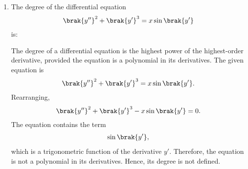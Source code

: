 \begin{enumerate}[label=\thesubsection.\arabic*, ref=\thesubsection.\theenumi]
\solution
Given,
\begin{align}
y = \tan^{-1}\brak{x^2}\label{eq:EE26BTECH11211_Prob_13.1}
\end{align}
from \eqref{eq:EE26BTECH11211_Prob_9.1} the derivative of $tan^{-1}u$ is
\begin{align}
\frac{d}{dx}\left(\tan^{-1}u\right)
= \frac{1}{1+u^2}\frac{du}{dx}\label{eq:EE26BTECH11211_Prob_13.2}.
\end{align}
Here, $u=x^2$, so
\begin{align}
\frac{du}{dx}=2x.
\end{align}
Applying the formula\eqref{eq:EE26BTECH11211_Prob_13.2} on \eqref{eq:EE26BTECH11211_Prob_13.1},
\begin{align}
\frac{dy}{dx}
= \frac{1}{1+\brak{x^2}^2}\cdot 2x.
\end{align}
Simplifying,
\begin{align}
\frac{dy}{dx}
= \frac{2x}{1+x^4}.
\end{align}


\item
The degree of the differential equation
\begin{align}
\brak{y''}^2 + \brak{y'}^3 = x\sin\brak{y'}
\end{align}
is:

\begin{enumerate}
\end{enumerate}
\solution
The degree of a differential equation is the highest power
of the highest-order derivative, provided the equation is
a polynomial in its derivatives.
The given equation is
\begin{align}
\brak{y''}^2 + \brak{y'}^3 = x\sin\brak{y'}.
\end{align}
Rearranging,
\begin{align}
\brak{y''}^2 + \brak{y'}^3 - x\sin\brak{y'} = 0.
\end{align}
The equation contains the term
\begin{align}
\sin\brak{y'},
\end{align}
which is a trigonometric function of the derivative $y'$.
Therefore, the equation is not a polynomial in its
derivatives. Hence, its degree is not defined.




\end{enumerate}
